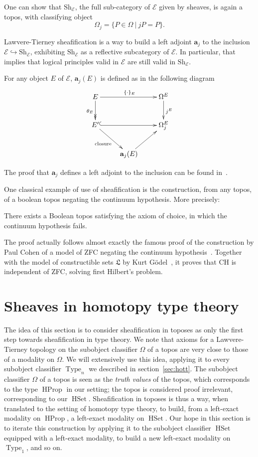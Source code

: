 \documentclass[notfinal]{jfrarticle}
\DeclareMathOperator{\Type}{Type}
\DeclareMathOperator{\HProp}{HProp}
\DeclareMathOperator{\HSet}{HSet}
\newcommand \Sh[1] {\mathrm{Sh}_{#1}}
\begin{document}
One can show that $\Sh{\mathcal E}$, the full sub-category of
$\mathcal E$ given by
sheaves, is again a topos, with classifying object
%
\[
\Omega_j = \{ P \in \Omega \ | \ j P  = P \}.
\]

Lawvere-Tierney sheafification is a way to build a left adjoint $\mathbf{a}_j$ to the
inclusion $\mathcal E \hookrightarrow \Sh{\mathcal E}$, exhibiting
$\Sh{\mathcal E}$ as a reflective subcategory of $\mathcal E$. In
particular, that implies that logical principles valid in $\mathcal E$
are still valid in $\Sh{\mathcal E}$.

For any object $E$ of $\mathcal E$, $\mathbf{a}_j(E)$ is defined as in
the following diagram
\[
  \xymatrix{ 
    E \ar[rr]^{\{\cdot\}_E} \ar@{->>}[d]_{\theta_E} && \Omega^E \ar[d]^{j^E}\\
    E' \ar@{^{(}->}[rr] \ar[dr]_{\text{closure}} && \Omega_j^E \\
    & \mathbf{a}_j(E) \ar[ur]&
  }
\]

The proof that $\mathbf a_j$ defines a left adjoint to the inclusion
can be found in~\cite{maclanemoerdijk}.

One classical example of use of sheafification is the construction,
from any topos, of a boolean topos negating the continuum
hypothesis. More precisely:

\begin{thm}
  There exists a Boolean topos satisfying the axiom of choice, in
  which the continuum hypothesis fails.
\end{thm}

The proof actually follows almost exactly the famous proof of the
construction by Paul Cohen of a model of ZFC negating the continuum
hypothesis~\cite{cohen1966}. Together with the model of constructible
sets $\mathfrak L$ by Kurt Gödel~\cite{godel40}, it proves that CH is
independent of ZFC, solving first Hilbert's problem.

\section{Sheaves in homotopy type theory}
\label{sec:sheaf_hott}

The idea of this section is to consider sheafification in toposes as
only the first step towards sheafification in type theory. 
We note that axioms for a Lawvere-Tierney topology on the subobject
classifier $\Omega$ of a topos are very close to
those of a modality on $\Omega$. We will extensively use this idea,
applying it to every subobject classifier $\Type_n$ we described
in section~\ref{sec:hott}. The subobject
classifier $\Omega$ of a topos is seen as the {\em truth values} of the
topos, which corresponds to the type $\HProp$ in our setting; the
topos is considered proof irrelevant, corresponding to our
$\HSet$. Sheafification in toposes is thus a way, when translated to the
setting of homotopy type theory, to build, from a left-exact modality on
$\HProp$, a left-exact modality on $\HSet$. Our hope in this section
is to iterate this construction by applying it to the subobject
classifier $\HSet$ equipped with a left-exact modality, to build a new
left-exact modality on $\Type_1$, and so on. 
\end{document}
